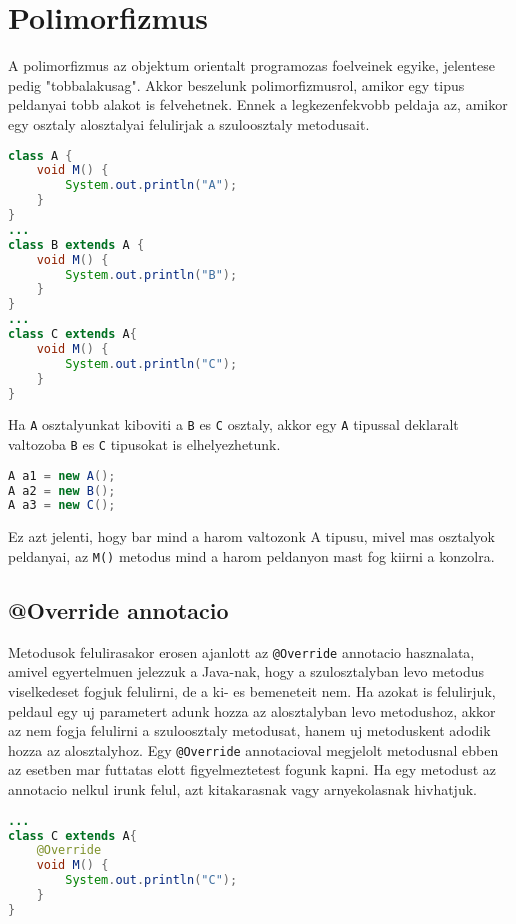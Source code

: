 \documentclass{article}
\let\l\lstinline
\begin{document}
\section{Polimorfizmus}

A polimorfizmus az objektum orientalt programozas foelveinek egyike, jelentese pedig "tobbalakusag".
Akkor beszelunk polimorfizmusrol, amikor egy tipus peldanyai tobb alakot is felvehetnek.
Ennek a legkezenfekvobb peldaja az, amikor egy osztaly alosztalyai felulirjak a szuloosztaly metodusait.

\begin{lstlisting}[language=Java, caption=Pelda osztalyok metodus felulirassal]
class A {
    void M() {
        System.out.println("A");
    }
}
...
class B extends A {
    void M() {
        System.out.println("B");
    }
}
...
class C extends A{
    void M() {
        System.out.println("C");
    }
}
\end{lstlisting}

\newpage

Ha \l{A} osztalyunkat kiboviti a \l{B} es \l{C} osztaly, akkor egy \l{A} tipussal deklaralt valtozoba \l{B} es \l{C} tipusokat is elhelyezhetunk.

\begin{lstlisting}[language=Java, caption=Polimorfizmus pelda]
A a1 = new A();
A a2 = new B();
A a3 = new C();
\end{lstlisting}

Ez azt jelenti, hogy bar mind a harom valtozonk A tipusu, mivel mas osztalyok peldanyai, az \l{M()} metodus mind a harom peldanyon mast fog kiirni a konzolra.

\subsection{@Override annotacio}

Metodusok felulirasakor erosen ajanlott az \l{@Override} annotacio hasznalata, amivel egyertelmuen jelezzuk a Java-nak, hogy a szulosztalyban levo metodus viselkedeset fogjuk felulirni, de a ki- es bemeneteit nem.
Ha azokat is felulirjuk, peldaul egy uj parametert adunk hozza az alosztalyban levo metodushoz, akkor az nem fogja felulirni a szuloosztaly metodusat, hanem uj metoduskent adodik hozza az alosztalyhoz.
Egy \l{@Override} annotacioval megjelolt metodusnal ebben az esetben mar futtatas elott figyelmeztetest fogunk kapni.
Ha egy metodust az annotacio nelkul irunk felul, azt kitakarasnak vagy arnyekolasnak hivhatjuk.

\begin{lstlisting}[language=Java, caption=Override annotacio hasznalata]
...
class C extends A{
    @Override
    void M() {
        System.out.println("C");
    }
}
\end{lstlisting}
\end{document}
